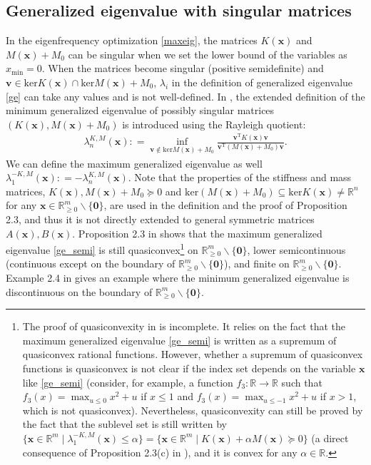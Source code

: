 \documentclass[sn-mathphys,Numbered]{sn-jnl}%
\theoremstyle{thmstyleone}%
\theoremstyle{thmstyletwo}%
\theoremstyle{thmstylethree}%
\def\coloneq{\mathrel{\mathop:}=}
\def\rn{\mathbb{R}^n}
\def\rm{\mathbb{R}^m}
\def\tp{\mathrm{T}}
\begin{document}
\begin{appendices}

\section{Generalized eigenvalue with singular matrices}
\label{a_dis}

In the eigenfrequency optimization \eqref{maxeig}, the matrices $K(\bm{x})$ and $M(\bm{x})+M_0$ can be singular when we set the lower bound of the variables as $x_{\mathrm{min}}=0$. When the matrices become singular (positive semidefinite) and $\bm{v}\in\mathrm{ker}K(\bm{x})\cap\mathrm{ker}M(\bm{x})+M_0$, $\lambda_i$ in the definition of generalized eigenvalue \eqref{ge} can take any values and is not well-defined. In \cite{achtziger07siam}, the extended definition of the minimum generalized eigenvalue of possibly singular matrices $(K(\bm{x}),M(\bm{x})+M_0)$ is introduced using the Rayleigh quotient:
\begin{align}
\lambda^{K,M}_n(\bm{x})\coloneq \underset{\bm{v}\notin\mathrm{ker}M(\bm{x})+M_0}{\inf}\frac{\bm{v}^\tp K(\bm{x})\bm{v}}{\bm{v}^\tp (M(\bm{x})+M_0)\bm{v}}.
\label{ge_semi}
\end{align}
We can define the maximum generalized eigenvalue as well $\lambda^{-K,M}_1(\bm{x})\coloneq-\lambda^{K,M}_n(\bm{x})$. Note that the properties of the stiffness and mass matrices, $K(\bm{x}),M(\bm{x})+M_0\succeq 0$ and $\mathrm{ker}(M(\bm{x})+M_0)\subseteq\mathrm{ker}K(\bm{x})\neq\rn$ for any $\bm{x}\in\rm_{\ge 0}\backslash\{\bm{0}\}$, are used in the definition and the proof of Proposition 2.3, and thus it is not directly extended to general symmetric matrices $A(\bm{x}),B(\bm{x})$. Proposition 2.3 in \cite{achtziger07siam} shows that the maximum generalized eigenvalue \eqref{ge_semi} is still quasiconvex\footnote{The proof of quasiconvexity in \cite{achtziger07siam} is incomplete. It relies on the fact that the maximum generalized eigenvalue \eqref{ge_semi} is written as a supremum of quasiconvex rational functions. However, whether a supremum of quasiconvex functions is quasiconvex is not clear if the index set depends on the variable $\bm{x}$ like \eqref{ge_semi} (consider, for example, a function $f_3:\mathbb{R}\to\mathbb{R}$ such that $f_3(x)=\max_{u\le 0}x^2+u$ if $x\le 1$ and $f_3(x)=\max_{u\le -1}x^2+u$ if $x>1$, which is not quasiconvex). Nevertheless, quasiconvexity can still be proved by the fact that the sublevel set is still written by $\{\bm{x}\in\rm \mid\lambda^{-K,M}_1(\bm{x})\le\alpha\}=\{\bm{x}\in\rm \mid K(\bm{x})+\alpha M(\bm{x}) \succeq 0\}$ (a direct consequence of Proposition 2.3(c) in \cite{achtziger07siam}), and it is convex for any $\alpha\in\mathbb{R}$.} on $\rm_{\ge 0}\backslash\{\bm{0}\}$, lower semicontinuous (continuous except on the boundary of $\rm_{\ge 0}\backslash\{\bm{0}\}$), and finite on $\rm_{\ge 0}\backslash\{\bm{0}\}$. Example 2.4 in \cite{achtziger07siam} gives an example where the minimum generalized eigenvalue is discontinuous on the boundary of $\rm_{\ge 0}\backslash\{\bm{0}\}$. 


\end{appendices}
\end{document}
